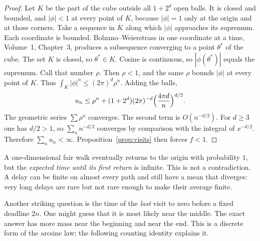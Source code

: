 \begin{proof}
Let $K$ be the part of the cube outside all $1+2^d$ open balls. It is closed and bounded, and $|\phi|<1$ at every point of $K$, because $|\phi|=1$ only at the origin and at those corners. Take a sequence in $K$ along which $|\phi|$ approaches its supremum. Each coordinate is bounded. Bolzano--Weierstrass in one coordinate at a time, Volume~1, Chapter~3, produces a subsequence converging to a point $\theta^*$ of the cube. The set $K$ is closed, so $\theta^*\in K$. Cosine is continuous, so $|\phi(\theta^*)|$ equals the supremum. Call that number $\rho$. Then $\rho<1$, and the same $\rho$ bounds $|\phi|$ at every point of $K$. Thus $\int_K|\phi|^n\le(2\pi)^d\rho^n$. Adding the balls,
\[
 u_n\le\rho^n+(1+2^d)(2\pi)^{-d}\Bigl(\frac{4\pi d}{n}\Bigr)^{d/2}.
\]
The geometric series $\sum\rho^n$ converges. The second term is $O(n^{-d/2})$. For $d\ge3$ one has $d/2>1$, so $\sum_n n^{-d/2}$ converges by comparison with the integral of $x^{-d/2}$. Therefore $\sum_n u_n<\infty$. Proposition~\ref{prop:visits} then forces $f<1$.
\end{proof}

A one-dimensional fair walk eventually returns to the origin with probability $1$, but the \emph{expected time until its first return} is infinite. This is not a contradiction. A delay can be finite on almost every path and still have a mean that diverges: very long delays are rare but not rare enough to make their average finite.

Another striking question is the time of the \emph{last} visit to zero before a fixed deadline $2n$. One might guess that it is most likely near the middle. The exact answer has more mass near the beginning and near the end. This is a discrete form of the arcsine law; the following counting identity explains it.

